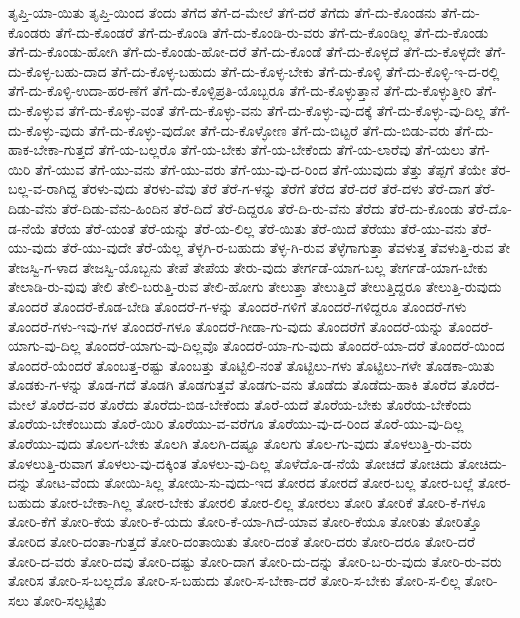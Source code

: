 {ತೃಪ್ತಿ-ಯಾ-ಯಿತು
ತೃಪ್ತಿ-ಯಿಂದ
ತೆಂದು
ತೆಗೆದ
ತೆಗೆ-ದ-ಮೇಲೆ
ತೆಗೆ-ದರೆ
ತೆಗೆದು
ತೆಗೆ-ದು-ಕೊಂಡನು
ತೆಗೆ-ದು-ಕೊಂಡರು
ತೆಗೆ-ದು-ಕೊಂಡರೆ
ತೆಗೆ-ದು-ಕೊಂಡಿ
ತೆಗೆ-ದು-ಕೊಂಡಿ-ರು-ವರು
ತೆಗೆ-ದು-ಕೊಂಡಿಲ್ಲ
ತೆಗೆ-ದು-ಕೊಂಡು
ತೆಗೆ-ದು-ಕೊಂಡು-ಹೋಗಿ
ತೆಗೆ-ದು-ಕೊಂಡು-ಹೋ-ದರೆ
ತೆಗೆ-ದು-ಕೊಂಡೆ
ತೆಗೆ-ದು-ಕೊಳ್ಳದೆ
ತೆಗೆ-ದು-ಕೊಳ್ಳದೇ
ತೆಗೆ-ದು-ಕೊಳ್ಳ-ಬಹು-ದಾದ
ತೆಗೆ-ದು-ಕೊಳ್ಳ-ಬಹುದು
ತೆಗೆ-ದು-ಕೊಳ್ಳ-ಬೇಕು
ತೆಗೆ-ದು-ಕೊಳ್ಳಿ
ತೆಗೆ-ದು-ಕೊಳ್ಳಿ-ಇ-ದ-ರಲ್ಲಿ
ತೆಗೆ-ದು-ಕೊಳ್ಳಿ-ಉದಾ-ಹರ-ಣೆಗೆ
ತೆಗೆ-ದು-ಕೊಳ್ಳಿಪ್ರತಿ-ಯೊಬ್ಬರೂ
ತೆಗೆ-ದು-ಕೊಳ್ಳುತ್ತಾನೆ
ತೆಗೆ-ದು-ಕೊಳ್ಳುತ್ತೀರಿ
ತೆಗೆ-ದು-ಕೊಳ್ಳುವ
ತೆಗೆ-ದು-ಕೊಳ್ಳು-ವಂತೆ
ತೆಗೆ-ದು-ಕೊಳ್ಳು-ವನು
ತೆಗೆ-ದು-ಕೊಳ್ಳು-ವು-ದಕ್ಕೆ
ತೆಗೆ-ದು-ಕೊಳ್ಳು-ವು-ದಿಲ್ಲ
ತೆಗೆ-ದು-ಕೊಳ್ಳು-ವುದು
ತೆಗೆ-ದು-ಕೊಳ್ಳು-ವುದೋ
ತೆಗೆ-ದು-ಕೊಳ್ಳೋಣ
ತೆಗೆ-ದು-ಬಿಟ್ಟರೆ
ತೆಗೆ-ದು-ಬಿಡು-ವರು
ತೆಗೆ-ದು-ಹಾಕ-ಬೇಕಾ-ಗುತ್ತದೆ
ತೆಗೆ-ಯ-ಬಲ್ಲರೊ
ತೆಗೆ-ಯ-ಬೇಕು
ತೆಗೆ-ಯ-ಬೇಕೆಂದು
ತೆಗೆ-ಯ-ಲಾರೆವು
ತೆಗೆ-ಯಲು
ತೆಗೆ-ಯಿರಿ
ತೆಗೆ-ಯುವ
ತೆಗೆ-ಯು-ವನು
ತೆಗೆ-ಯು-ವರು
ತೆಗೆ-ಯು-ವು-ದ-ರಿಂದ
ತೆಗೆ-ಯುವುದು
ತೆತ್ತು
ತೆಪ್ಪಗೆ
ತೆಯೇ
ತೆರ-ಬಲ್ಲ-ವ-ರಾಗಿದ್ದ
ತೆರಳು-ವುದು
ತೆರಳು-ವೆವು
ತೆರೆ
ತೆರೆ-ಗ-ಳನ್ನು
ತೆರೆಗೆ
ತೆರೆದ
ತೆರೆ-ದರೆ
ತೆರೆ-ದಳು
ತೆರೆ-ದಾಗ
ತೆರೆ-ದಿಡು-ವೆನು
ತೆರೆ-ದಿಡು-ವೆನು-ಹಿಂದಿನ
ತೆರೆ-ದಿದೆ
ತೆರೆ-ದಿದ್ದರೂ
ತೆರೆ-ದಿ-ರು-ವೆನು
ತೆರೆದು
ತೆರೆ-ದು-ಕೊಂಡು
ತೆರೆ-ದೊ-ಡ-ನೆಯೆ
ತೆರೆಯ
ತೆರೆ-ಯಂತೆ
ತೆರೆ-ಯನ್ನು
ತೆರೆ-ಯ-ಲಿಲ್ಲ
ತೆರೆ-ಯಿತು
ತೆರೆ-ಯಿದೆ
ತೆರೆಯು
ತೆರೆ-ಯು-ವನು
ತೆರೆ-ಯು-ವುದು
ತೆರೆ-ಯು-ವುದೇ
ತೆರೆ-ಯೆಲ್ಲ
ತೆಳ್ಳಗಿ-ರ-ಬಹುದು
ತೆಳ್ಳ-ಗಿ-ರುವ
ತೆಳ್ಳೆಗಾಗುತ್ತಾ
ತೆವಳುತ್ತ
ತೆವಳುತ್ತಿ-ರುವ
ತೇ
ತೇಜಸ್ವಿ-ಗ-ಳಾದ
ತೇಜಸ್ವಿ-ಯೊಬ್ಬನು
ತೇಪೆ
ತೇಪೆಯ
ತೇರು-ವುದು
ತೇರ್ಗಡೆ-ಯಾಗ-ಬಲ್ಲ
ತೇರ್ಗಡೆ-ಯಾಗ-ಬೇಕು
ತೇಲಾಡಿ-ರು-ವುವು
ತೇಲಿ
ತೇಲಿ-ಬರುತ್ತಿ-ರುವ
ತೇಲಿ-ಹೋಗು
ತೇಲುತ್ತಾ
ತೇಲುತ್ತಿದೆ
ತೇಲುತ್ತಿದ್ದರೂ
ತೇಲುತ್ತಿ-ರುವುದು
ತೊಂದರೆ
ತೊಂದರೆ-ಕೊಡ-ಬೇಡಿ
ತೊಂದರೆ-ಗ-ಳನ್ನು
ತೊಂದರೆ-ಗಳಿಗೆ
ತೊಂದರೆ-ಗಳಿದ್ದರೂ
ತೊಂದರೆ-ಗಳು
ತೊಂದರೆ-ಗಳು-ಇವು-ಗಳ
ತೊಂದರೆ-ಗಳೂ
ತೊಂದರೆ-ಗೀಡಾ-ಗು-ವುದು
ತೊಂದರೆಗೆ
ತೊಂದರೆ-ಯನ್ನು
ತೊಂದರೆ-ಯಾಗು-ವು-ದಿಲ್ಲ
ತೊಂದರೆ-ಯಾಗು-ವು-ದಿಲ್ಲವೊ
ತೊಂದರೆ-ಯಾ-ಗು-ವುದು
ತೊಂದರೆ-ಯಾ-ದರೆ
ತೊಂದರೆ-ಯಿಂದ
ತೊಂದರೆ-ಯೆಂದರೆ
ತೊಂಬತ್ತ-ರಷ್ಟು
ತೊಂಬತ್ತು
ತೊಟ್ಟಿಲಿ-ನಂತೆ
ತೊಟ್ಟಿಲು-ಗಳು
ತೊಟ್ಟಿಲು-ಗಳೇ
ತೊಡಕಾ-ಯಿತು
ತೊಡಕು-ಗ-ಳನ್ನು
ತೊಡ-ಗದೆ
ತೊಡಗಿ
ತೊಡಗುತ್ತವೆ
ತೊಡಗು-ವನು
ತೊಡೆದು
ತೊಡೆದು-ಹಾಕಿ
ತೊರೆದ
ತೊರೆದ-ಮೇಲೆ
ತೊರೆದ-ವರ
ತೊರೆದು
ತೊರೆದು-ಬಿಡ-ಬೇಕೆಂದು
ತೊರೆ-ಯದೆ
ತೊರೆಯ-ಬೇಕು
ತೊರೆಯ-ಬೇಕೆಂದು
ತೊರೆಯ-ಬೇಕೆಂಬುದು
ತೊರೆ-ಯಿರಿ
ತೊರೆಯು-ವ-ವರೆಗೂ
ತೊರೆಯು-ವು-ದ-ರಿಂದ
ತೊರೆ-ಯು-ವು-ದಿಲ್ಲ
ತೊರೆಯು-ವುದು
ತೊಲಗ-ಬೇಕು
ತೊಲಗಿ
ತೊಲಗಿ-ದಷ್ಟೂ
ತೊಲಗು
ತೊಲ-ಗು-ವುದು
ತೊಳಲುತ್ತಿ-ರು-ವರು
ತೊಳಲುತ್ತಿ-ರುವಾಗ
ತೊಳಲು-ವು-ದಕ್ಕಿಂತ
ತೊಳಲು-ವು-ದಿಲ್ಲ
ತೊಳೆದೊ-ಡ-ನೆಯೆ
ತೋಚದೆ
ತೋಚಿದು
ತೋಚಿದು-ದನ್ನು
ತೋಟ-ವೆಂದು
ತೋಯಿ-ಸಿಲ್ಲ
ತೋಯಿ-ಸು-ವುದು-ಇದ
ತೋರದ
ತೋರದೆ
ತೋರ-ಬಲ್ಲ
ತೋರ-ಬಲ್ಲೆ
ತೋರ-ಬಹುದು
ತೋರ-ಬೇಕಾ-ಗಿಲ್ಲ
ತೋರ-ಬೇಕು
ತೋರಲಿ
ತೋರ-ಲಿಲ್ಲ
ತೋರಲು
ತೋರಿ
ತೋರಿಕೆ
ತೋರಿ-ಕೆ-ಗಳೂ
ತೋರಿ-ಕೆಗೆ
ತೋರಿ-ಕೆಯ
ತೋರಿ-ಕೆ-ಯದು
ತೋರಿ-ಕೆ-ಯಾ-ಗಿದೆ-ಯಾವ
ತೋರಿ-ಕೆಯೂ
ತೋರಿತು
ತೋರಿತ್ತೊ
ತೋರಿದ
ತೋರಿ-ದಂತಾ-ಗುತ್ತದೆ
ತೋರಿ-ದಂತಾಯಿತು
ತೋರಿ-ದಂತೆ
ತೋರಿ-ದರು
ತೋರಿ-ದರೂ
ತೋರಿ-ದರೆ
ತೋರಿ-ದ-ವರು
ತೋರಿ-ದವು
ತೋರಿ-ದಷ್ಟು
ತೋರಿ-ದಾಗ
ತೋರಿ-ದು-ದನ್ನು
ತೋರಿ-ಬ-ರು-ವುದು
ತೋರಿ-ರು-ವರು
ತೋರಿಸ
ತೋರಿ-ಸ-ಬಲ್ಲದೊ
ತೋರಿ-ಸ-ಬಹುದು
ತೋರಿ-ಸ-ಬೇಕಾ-ದರೆ
ತೋರಿ-ಸ-ಬೇಕು
ತೋರಿ-ಸ-ಲಿಲ್ಲ
ತೋರಿ-ಸಲು
ತೋರಿ-ಸಲ್ಪಟ್ಟಿತು
}
